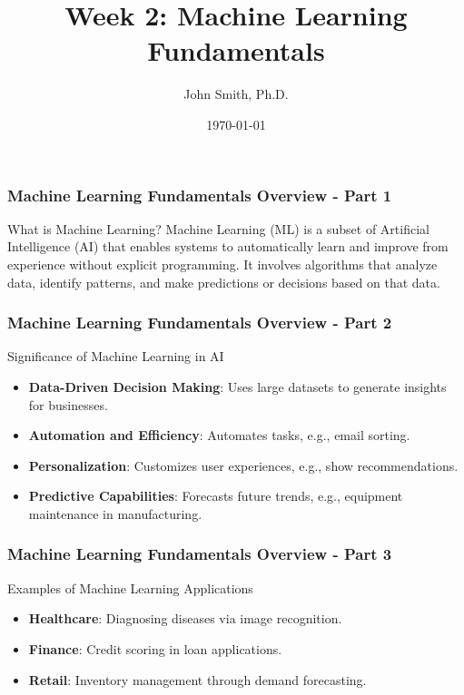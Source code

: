 \documentclass[aspectratio=169]{beamer}
\title[Machine Learning Fundamentals]{Week 2: Machine Learning Fundamentals}
\author[J. Smith]{John Smith, Ph.D.}
\institute[University Name]{
  Department of Computer Science\\
  University Name\\
  \vspace{0.3cm}
  Email: email@university.edu\\
  Website: www.university.edu
}
\date{\today}
\begin{document}
\frame{\titlepage}

\begin{frame}[fragile]
    \titlepage
\end{frame}

\begin{frame}[fragile]
    \frametitle{Machine Learning Fundamentals Overview - Part 1}
    \begin{block}{What is Machine Learning?}
        Machine Learning (ML) is a subset of Artificial Intelligence (AI) that enables systems to automatically learn and improve from experience without explicit programming. 
        It involves algorithms that analyze data, identify patterns, and make predictions or decisions based on that data.
    \end{block}
\end{frame}

\begin{frame}[fragile]
    \frametitle{Machine Learning Fundamentals Overview - Part 2}
    \begin{block}{Significance of Machine Learning in AI}
        \begin{itemize}
            \item \textbf{Data-Driven Decision Making}: Uses large datasets to generate insights for businesses.
            \item \textbf{Automation and Efficiency}: Automates tasks, e.g., email sorting.
            \item \textbf{Personalization}: Customizes user experiences, e.g., show recommendations.
            \item \textbf{Predictive Capabilities}: Forecasts future trends, e.g., equipment maintenance in manufacturing.
        \end{itemize}
    \end{block}
\end{frame}

\begin{frame}[fragile]
    \frametitle{Machine Learning Fundamentals Overview - Part 3}
    \begin{block}{Examples of Machine Learning Applications}
        \begin{itemize}
            \item \textbf{Healthcare}: Diagnosing diseases via image recognition.
            \item \textbf{Finance}: Credit scoring in loan applications.
            \item \textbf{Retail}: Inventory management through demand forecasting.
        \end{itemize}
    \end{block}
\end{frame}
\end{document}
